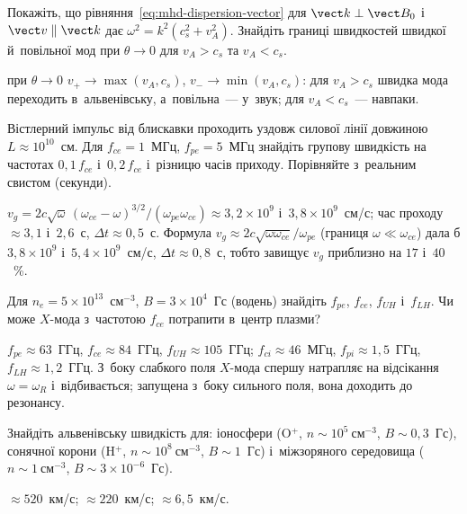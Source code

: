 \begin{problem}\label{prb:MhdModes}
	Покажіть, що рівняння~\eqref{eq:mhd-dispersion-vector} для $\vect k\perp\vect B_0$ і~$\vect v\parallel\vect k$ дає
	$\omega^2=k^2(c_s^2+v_A^2)$. Знайдіть границі швидкостей швидкої й~повільної мод при $\theta\to0$ для
	$v_A>c_s$ та $v_A<c_s$.
	\begin{solution}
		при $\theta\to0$ $v_+\to\max(v_A,c_s)$, $v_-\to\min(v_A,c_s)$: для $v_A>c_s$ швидка мода
	переходить в~альвенівську, а~повільна~--- у~звук; для $v_A<c_s$~--- навпаки.
	\end{solution}
\end{problem}

\begin{problem}\label{prb:Whistler}
	Вістлерний імпульс від блискавки проходить уздовж силової лінії довжиною
	$L\approx10^{10}$~см. Для $f_{ce}=1$~МГц, $f_{pe}=5$~МГц знайдіть групову швидкість на частотах
	$0{,}1\,f_{ce}$ і~$0{,}2\,f_{ce}$ і~різницю часів приходу. Порівняйте з~реальним свистом
	(секунди).
	\begin{solution}
		$v_g=2c\sqrt{\omega}\,(\omega_{ce}-\omega)^{3/2}/(\omega_{pe}\omega_{ce})\approx3{,}2\times10^{9}$ і~$3{,}8\times10^{9}$~см/с;
		час проходу $\approx3{,}1$ і~$2{,}6$~с, $\Delta t\approx0{,}5$~с. Формула $v_g\approx2c\sqrt{\omega\omega_{ce}}/\omega_{pe}$ (границя $\omega\ll\omega_{ce}$) дала б
		$3{,}8\times10^{9}$ і~$5{,}4\times10^{9}$~см/с, $\Delta t\approx0{,}8$~с, тобто завищує $v_g$ приблизно на $17$ і~$40$~\%.
	\end{solution}
\end{problem}

\begin{problem}\label{prb:HybridResonances}
	Для $n_e=5\times10^{13}$~см$^{-3}$, $B=3\times10^4$~Гс (водень) знайдіть $f_{pe}$, $f_{ce}$, $f_{UH}$
	і~$f_{LH}$. Чи може $X$-мода з~частотою $f_{ce}$ потрапити в~центр плазми?
	\begin{solution}
		$f_{pe}\approx63$~ГГц, $f_{ce}\approx84$~ГГц, $f_{UH}\approx105$~ГГц; $f_{ci}\approx46$~МГц,
	$f_{pi}\approx1{,}5$~ГГц, $f_{LH}\approx1{,}2$~ГГц. З~боку слабкого поля $X$-мода спершу натрапляє
	на відсікання $\omega=\omega_R$ і~відбивається; запущена з~боку сильного поля, вона доходить до резонансу.
	\end{solution}
\end{problem}

\begin{problem}\label{prb:AlfvenAstro}
	Знайдіть альвенівську швидкість для: іоносфери (O$^+$, $n\sim10^{5}~\text{см}^{-3}$, $B\sim0{,}3$~Гс),
	сонячної корони (H$^+$, $n\sim10^{8}~\text{см}^{-3}$, $B\sim1$~Гс) і~міжзоряного середовища
	($n\sim1~\text{см}^{-3}$, $B\sim3\times10^{-6}$~Гс).
	\begin{solution}
		$\approx520$~км/с; $\approx220$~км/с; $\approx6{,}5$~км/с.
	\end{solution}
\end{problem}

